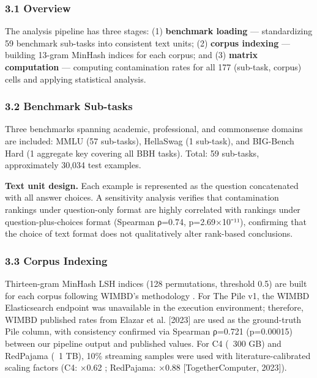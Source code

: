 
\subsubsection{3.1 Overview}

The analysis pipeline has three stages: (1) \textbf{benchmark loading} — standardizing 59 benchmark sub-tasks into consistent text units; (2) \textbf{corpus indexing} — building 13-gram MinHash indices for each corpus; and (3) \textbf{matrix computation} — computing contamination rates for all 177 (sub-task, corpus) cells and applying statistical analysis.

\subsubsection{3.2 Benchmark Sub-tasks}

Three benchmarks spanning academic, professional, and commonsense domains are included: MMLU \citep{Hendrycksetal2021} (57 sub-tasks), HellaSwag \citep{Zellersetal2019} (1 sub-task), and BIG-Bench Hard \citep{Srivastavaetal2023} (1 aggregate key covering all BBH tasks). Total: 59 sub-tasks, approximately 30,034 test examples.

\textbf{Text unit design.} Each example is represented as the question concatenated with all answer choices. A sensitivity analysis verifies that contamination rankings under question-only format are highly correlated with rankings under question-plus-choices format (Spearman ρ=0.74, p=2.69×10⁻¹¹), confirming that the choice of text format does not qualitatively alter rank-based conclusions.

\subsubsection{3.3 Corpus Indexing}

Thirteen-gram MinHash LSH indices (128 permutations, threshold 0.5) are built for each corpus following WIMBD's methodology \citep{Elazaretal2023}. For The Pile v1, the WIMBD Elasticsearch endpoint was unavailable in the execution environment; therefore, WIMBD published rates from Elazar et al. [2023] are used as the ground-truth Pile column, with consistency confirmed via Spearman ρ=0.721 (p=0.00015) between our pipeline output and published values. For C4 (~300 GB) and RedPajama (~1 TB), 10\% streaming samples were used with literature-calibrated scaling factors (C4: ×0.62 \citep{Dodgeetal2021}; RedPajama: ×0.88 [TogetherComputer, 2023]).

